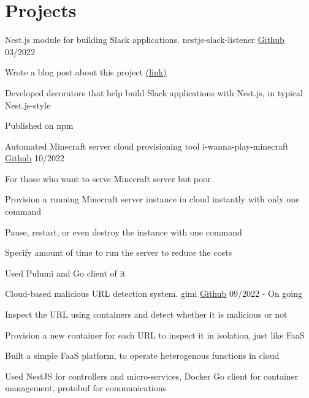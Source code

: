 \section{Projects}

\cventry
{Nest.js module for building Slack applications.}
{nestjs-slack-listener}
{\href{https://github.com/hanchchch/nestjs-slack-listener}{Github}}
{03/2022}
\begin{cvitems}
\item {Wrote a blog post about this project \href{https://velog.io/@hanchchch/%EC%A7%84%EC%8B%AC%EC%9C%BC%EB%A1%9C-%EC%97%85%EB%AC%B4-%EC%9E%90%EB%8F%99%ED%99%94-%EC%8A%AC%EB%9E%99%EB%B4%87-%EB%A7%8C%EB%93%A4%EA%B8%B0-1}{(link)}}
\item {Developed decorators that help build Slack applications with Nest.js, in typical Nest.js-style}
\item {Published on npm}
\end{cvitems}

\cventry
{Automated Minecraft server cloud provisioning tool}
{i-wanna-play-minecraft}
{\href{https://github.com/hanchchch/i-wanna-play-minecraft}{Github}}
{10/2022}
\begin{cvitems}
\item {For those who want to serve Minecraft server but poor}
\item {Provision a running Minecraft server instance in cloud instantly with only one command}
\item {Pause, restart, or even destroy the instance with one command}
\item {Specify amount of time to run the server to reduce the costs}
\item {Used Pulumi and Go client of it}
\end{cvitems}

\cventry
{Cloud-based malicious URL detection system.}
{gimi}
{\href{https://github.com/hanchchch/gimi}{Github}}
{09/2022 - On going}
\begin{cvitems}
\item {Inspect the URL using containers and detect whether it is malicious or not}
\item {Provision a new container for each URL to inspect it in isolation, just like FaaS}
\item {Built a simple FaaS platform, to operate heterogenous functions in cloud}
\item {Used NestJS for controllers and micro-services, Docker Go client for container management, protobuf for communications}
\end{cvitems}

